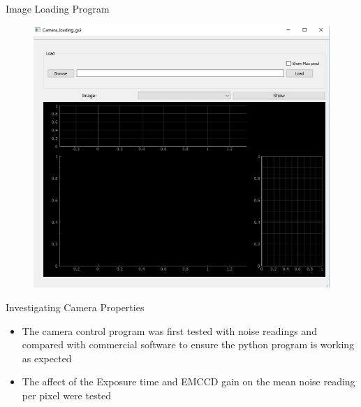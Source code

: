 \documentclass{beamer}
\begin{document}
\begin{frame}{Image Loading Program}

\begin{figure}
\centering
\includegraphics[scale=0.4]{Figures/pic_load_program.PNG}
\end{figure}


\end{frame}

\begin{frame}{Investigating Camera Properties}

\begin{itemize}
\item The camera control program was first tested with noise readings and compared with commercial software to ensure the python program is working as expected
\bigskip
\item The affect of the Exposure time and EMCCD gain on the mean noise reading per pixel were tested

\end{itemize}



\end{frame}
\end{document}
